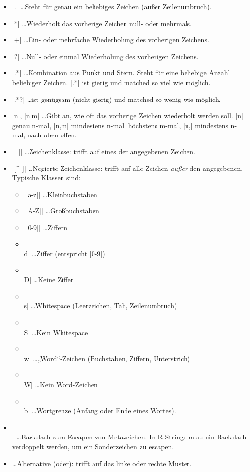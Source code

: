 \documentclass[10pt,twocolumn]{scrartcl}
\renewcommand{\lstinline}{\mycoloredinline}
\begin{document}
\begin{itemize}
\item \lstinline|.| \dots Steht für genau ein beliebiges Zeichen (außer Zeilenumbruch).
\item \lstinline|*| \dots Wiederholt das vorherige Zeichen null- oder mehrmals.
\item \lstinline|+| \dots Ein- oder mehrfache Wiederholung des vorherigen Zeichens.
\item \lstinline|?| \dots Null- oder einmal Wiederholung des vorherigen Zeichens.
\item \lstinline|.*| \dots Kombination aus Punkt und Stern. Steht für eine beliebige Anzahl beliebiger Zeichen. \lstinline|.*| ist gierig und matched so viel wie möglich.
\item \lstinline|.*?| \dots ist genügsam (nicht gierig) und matched so wenig wie möglich.
\item \lstinline|{n}|, \lstinline|{n,m}| \dots Gibt an, wie oft das vorherige Zeichen wiederholt werden soll. \lstinline|{n}| genau n-mal, \lstinline|{n,m}| mindestens n-mal, höchstens m-mal, \lstinline|{n,}| mindestens n-mal, nach oben offen.
\item \lstinline|[ ]| \dots Zeichenklasse: trifft auf eines der angegebenen Zeichen.
\item \lstinline|[^ ]| \dots Negierte Zeichenklasse: trifft auf alle Zeichen \emph{außer} den angegebenen.\\
Typische Klassen sind:
  \begin{itemize}
  \item \lstinline|[a-z]| \dots Kleinbuchstaben
  \item \lstinline|[A-Z]| \dots Großbuchstaben
  \item \lstinline|[0-9]| \dots Ziffern
  \item \lstinline|\\d| \dots Ziffer (entspricht [0-9])
  \item \lstinline|\\D| \dots Keine Ziffer
  \item \lstinline|\\s| \dots Whitespace (Leerzeichen, Tab, Zeilenumbruch)
  \item \lstinline|\\S| \dots Kein Whitespace
  \item \lstinline|\\w| \dots „Word“-Zeichen (Buchstaben, Ziffern, Unterstrich)
  \item \lstinline|\\W| \dots Kein Word-Zeichen
  \item \lstinline|\\b| \dots Wortgrenze (Anfang oder Ende eines Wortes).
  \end{itemize}
\item \lstinline|\\| \dots Backslash zum Escapen von Metazeichen. In R-Strings muss ein Backslash verdoppelt werden, um ein Sonderzeichen zu escapen.
\item \lstinline{|} \dots Alternative (oder): trifft auf das linke oder rechte Muster.
\end{itemize}
\end{document}
